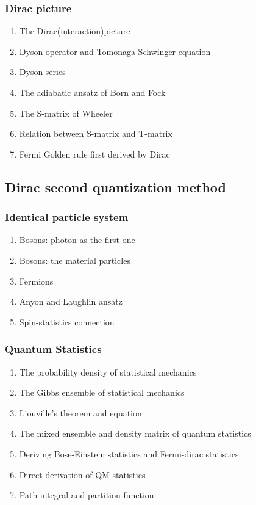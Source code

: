 \documentclass[12pt]{article}
\numberwithin{equation}{section}
\begin{document}
\subsubsection{Dirac picture}
\begin{enumerate}
\item The Dirac(interaction)picture
\item Dyson operator and Tomonaga-Schwinger equation
\item Dyson series
\item The adiabatic ansatz of Born and Fock
\item The S-matrix of Wheeler
\item Relation between S-matrix and T-matrix
\item Fermi Golden rule first derived by Dirac
\end{enumerate}
\subsection{Dirac second quantization method}
\subsubsection{Identical particle system}
\begin{enumerate}
\item Bosons: photon as the first one
\item Bosons: the material particles
\item Fermions
\item Anyon and Laughlin ansatz
\item Spin-statistics connection
\end{enumerate}
\subsubsection{Quantum Statistics}
\begin{enumerate}
\item The probability density of statistical mechanics
\item The Gibbs ensemble of statistical mechanics
\item Liouville's theorem and equation
\item The mixed ensemble and density matrix of quantum statistics
\item Deriving Bose-Einstein statistics and Fermi-dirac statistics
\item Direct derivation of QM statistics
\item Path integral and partition function
\end{enumerate}
\end{document}
